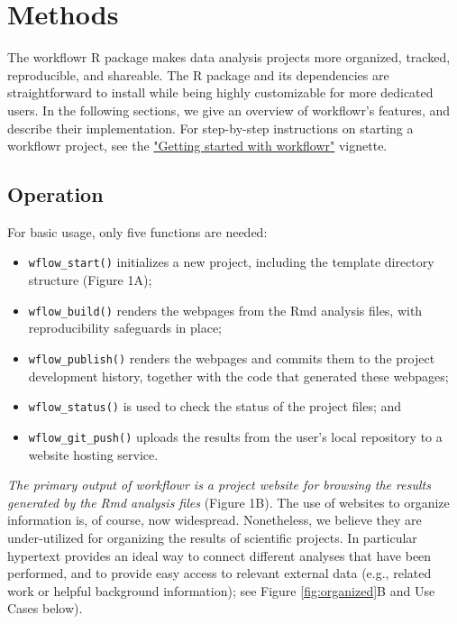 \documentclass[9pt,a4paper]{extarticle}
\begin{document}
\section*{Methods}

The workflowr R package makes data analysis projects more organized,
tracked, reproducible, and shareable. The R package and its dependencies
are straightforward to install while being highly customizable for more
dedicated users. In the following sections, we give an overview of
workflowr's features, and describe their implementation. For
step-by-step instructions on starting a workflowr project, see the
\href{https://jdblischak.github.io/workflowr/articles/wflow-01-getting-started.html}{"Getting
started with workflowr"} vignette.

\subsection*{Operation}

For basic usage, only five functions are needed:

\begin{itemize}

\item \texttt{wflow\_start()} initializes a new project, including the template
directory structure (Figure 1A);

\item \texttt{wflow\_build()} renders the webpages from the Rmd analysis files,
with reproducibility safeguards in place;

\item \texttt{wflow\_publish()} renders the webpages and commits them to the
project development history, together with the code that generated these
webpages;

\item \texttt{wflow\_status()} is used to check the status of the project files;
and

\item \texttt{wflow\_git\_push()} uploads the results from the user's local
repository to a website hosting service.

\end{itemize}

\textit{The primary output of workflowr is a project website for
browsing the results generated by the Rmd analysis files} (Figure 1B).
The use of websites to organize information is, of course, now
widespread. Nonetheless, we believe they are under-utilized for
organizing the results of scientific projects. In particular hypertext
provides an ideal way to connect different analyses that have been
performed, and to provide easy access to relevant external data (e.g.,
related work or helpful background information); see Figure \ref{fig:organized}B and Use
Cases below).
\end{document}
